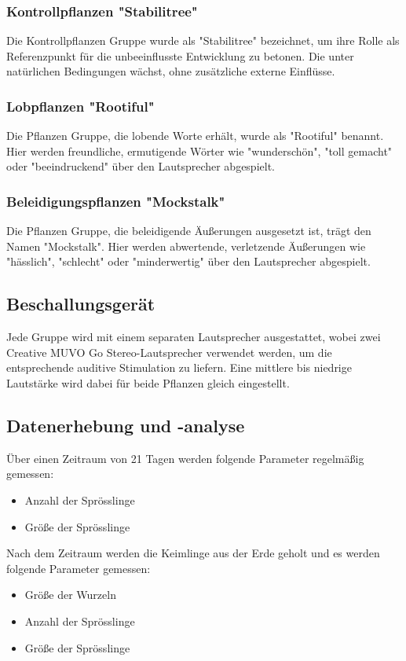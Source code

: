     \subsubsection{Kontrollpflanzen "Stabilitree"}
    Die Kontrollpflanzen Gruppe wurde als "Stabilitree" bezeichnet, um ihre Rolle als Referenzpunkt für die unbeeinflusste Entwicklung zu betonen. Die unter natürlichen Bedingungen wächst, ohne zusätzliche externe Einflüsse.
    
    \subsubsection{Lobpflanzen "Rootiful"}
    Die Pflanzen Gruppe, die lobende Worte erhält, wurde als "Rootiful" benannt. Hier werden freundliche, ermutigende Wörter wie "wunderschön", "toll gemacht" oder "beeindruckend" über den Lautsprecher abgespielt.
    
    \subsubsection{Beleidigungspflanzen "Mockstalk"}
    Die Pflanzen Gruppe, die beleidigende Äußerungen ausgesetzt ist, trägt den Namen "Mockstalk". Hier werden abwertende, verletzende Äußerungen wie "hässlich", "schlecht" oder "minderwertig" über den Lautsprecher abgespielt.

    \subsection{Beschallungsgerät}
    Jede Gruppe wird mit einem separaten Lautsprecher ausgestattet, wobei zwei \\ Creative MUVO Go Stereo-Lautsprecher verwendet werden, um die entsprechende auditive Stimulation zu liefern. Eine mittlere bis niedrige Lautstärke wird dabei für beide Pflanzen gleich eingestellt.

    \subsection{Datenerhebung und -analyse}
    Über einen Zeitraum von 21 Tagen werden folgende Parameter regelmäßig gemessen:
    \begin{itemize}
         \item Anzahl der Sprösslinge
         \item Größe der Sprösslinge
     \end{itemize}

    Nach dem Zeitraum werden die Keimlinge aus der Erde geholt und es werden folgende Parameter gemessen:
    \begin{itemize}
        \item Größe der Wurzeln
        \item Anzahl der Sprösslinge
        \item Größe der Sprösslinge
     \end{itemize}

